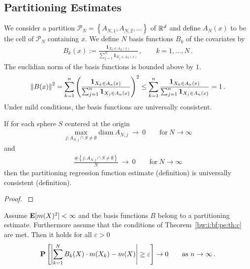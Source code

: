 \subsection*{Partitioning Estimates}
We consider a partition
$
  \mathcal{P}_N
  =
  \left\{ 
    A_{N,1}
    ,
    A_{N,2}
    ,
    \ldots
  \right\}
$
of $ \mathbb{R}^d $
and define
$ A_N(x) $ to be the cell of $ \mathcal{P}_N $ containing $x$.
We define $N$ basis functions $B_k$ of the covariates by
\begin{gather*}
  B_k(x)
  :=
  \frac{
  \mathbf{1}_{X_k \in A_N(x)}
  }{
  \sum_{j=1}^{N} 
  \mathbf{1}_{X_j \in A_N(x)}
  }
  \,,
  \qquad
  k=
  1,\ldots,N
  \,.
\end{gather*}
The euclidian norm of the basis functions is bounded above by $1$.
\begin{gather*}
  \left\lVert B(x)\right\rVert^2
  =
  \sum_{k=1}^{n} 
  \left( 
  \frac{
  \mathbf{1}_{X_k \in A_n(x)}
  }{
  \sum_{j=1}^{n} 
  \mathbf{1}_{X_j \in A_n(x)}
  }
  \right)
  ^2
  \le
  \sum_{k=1}^{n} 
  \frac{
  \mathbf{1}_{X_k \in A_n(x)}
  }{
  \sum_{j=1}^{n} 
  \mathbf{1}_{X_j \in A_n(x)}
  }
  =1
  \,.
\end{gather*}
Under mild conditions, the basis functions are universally consistent.
\begin{theorem}
  \label{bw:i:bf:pe:th:c}
  If for each sphere $S$ centered at the origin 
  \begin{gather}
    \max
    _
    {
      j\colon
      A_{N,j} 
      \cap
      S
      \neq
      \emptyset
    }
    \mathrm{diam}
    \ 
      A_{N,j} 
      \ 
      \to
      \ 
      0
      \qquad
      \text{for}\ 
      N\to \infty 
  \end{gather}
  and
  \begin{gather}
    \frac
    {
    \#
    \left\{  
      j\colon
      A_{N,j} 
      \cap
      S
      \neq
      \emptyset
    \right\}
    }
    {N}
      \ 
      \to
      \ 
      0
      \qquad
      \text{for}\ 
      N\to \infty 
  \end{gather}
  then the partitioning regression function estimate 
  (definition)
  is
  universally consistent (definition).
\end{theorem}
\begin{proof}
  \cite[Theorem~4.2.]{Gyorfi2002}
\end{proof}
\begin{corollary}
Assume
  $\mathbf{E}[m(X)^2]<\infty$
  and the basis functions $B$ belong to a partitioning estimate.
  Furthermore assume that the conditions of 
  Theorem~\ref{bw:i:bf:pe:th:c} are met.
Then it holds for all $\varepsilon>0$
\begin{gather}
  \P
  \left[ 
    \left| 
    \sum_{k=1}^{N} 
    B_k(X)
    \cdot
    m(X_k)
    -
    m(X)
    \right|
    \ge
    \varepsilon
  \right]
  \to
  0
  \qquad
  \text{as}
  \ 
  n\to \infty
  \,.
\end{gather}
\end{corollary}
